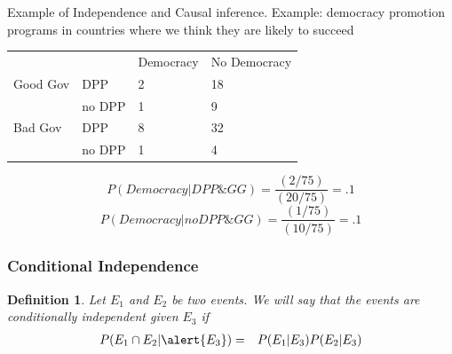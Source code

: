 \documentclass[handout]{beamer}
\newtheorem{defn}{Definition}
\numberwithin{equation}{section}
\begin{document}
\begin{frame}{Example of Independence and Causal inference.}
Example: democracy promotion programs in countries where we think they are likely to succeed\pause

\begin{table}
\begin{tabular}{llll}
		&&Democracy& No Democracy\\
 Good Gov & DPP &2 & 18\\
		 &no DPP & 1& 9\\
		 \hline
Bad Gov  & DPP &8 & 32\\
		&no DPP & 1& 4\\



\end{tabular}
\end{table}
\pause
$$P(Democracy| DPP\& GG)= \frac{(2/75)}{( 20/75)} = .1$$
$$P(Democracy| no DPP\& GG)=  \frac{(1/75)}{(10/75)} = .1$$

 \end{frame}




\begin{frame}
\frametitle{Conditional  Independence}

\begin{defn}
Let $E_{1}$ and $E_{2}$ be two events.  We will say that the events are conditionally independent given $E_{3}$ if 
\begin{eqnarray}
P(E_{1} \cap E_{2} | \alert{E_{3}}) & = & P(E_{1} | E_{3} ) P(E_{2} | E_{3} ) \nonumber 
\end{eqnarray}


\end{defn}



\end{frame}
\end{document}
